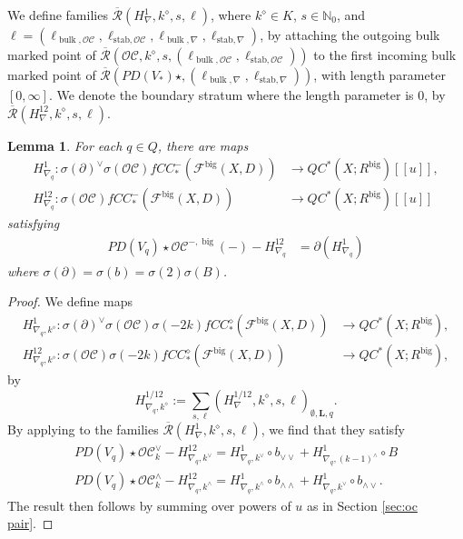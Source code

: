 \documentclass{article}
\newtheorem{lem}{Lemma}[section]
\def\fuk{\EuF}
\def\cO{\mathcal{O}}
\def\cC{\mathcal{C}}
\def\fuk{\mathcal{F}}
\def\Rbar{\overline{\mathcal{R}}}
\def\stab{\mathrm{stab}}
\def\big{{\operatorname{big}}}
\def\bL{\mathbf{L}}
\def\bulk{{\operatorname{bulk}}}
\begin{document}
We define families $\Rbar(H^{1}_\nabla,k^\diamond,s,\ell)$, where $k^\diamond \in K$, $s \in \mathbb{N}_0$, and $\ell=(\ell_{\bulk,\cO\cC},\ell_{\stab,\cO\cC},\ell_{\bulk,\nabla},\ell_{\stab,\nabla})$, by attaching the outgoing bulk marked point of $\Rbar(\cO\cC,k^\diamond,s,(\ell_{\bulk,\cO\cC},\ell_{\stab,\cO\cC}))$ to the first incoming bulk marked point of $\Rbar(PD(V_*)\star,(\ell_{\bulk,\nabla},\ell_{\stab,\nabla}))$, with length parameter $[0,\infty]$. 
We denote the boundary stratum where the length parameter is $0$, by $\Rbar(H^{12}_\nabla,k^\diamond,s,\ell)$.

\begin{lem}\label{lem:conn 1}
    For each $q \in Q$, there are maps
    \begin{align*}
        H^1_{\nabla_q}:\sigma(\partial)^\vee \sigma(\cO\cC) fCC_*^-(\fuk^\big(X,D)) & \to QC^*(X;R^\big)[[u]],\\
        H^{12}_{\nabla_q}:\sigma(\cO\cC)fCC_*^-(\fuk^\big(X,D)) &\to QC^*(X;R^\big)[[u]]
    \end{align*}
    satisfying
    \begin{align}\label{eq:H1 nab}
        PD(V_q) \star \cO\cC^{-,\big}(-) - H^{12}_{\nabla_q} &= \partial(H^1_{\nabla_q})
    \end{align}
    where $\sigma(\partial) = \sigma(b) = \sigma(2)\sigma(B)$.
\end{lem}
\begin{proof}
    We define maps
    \begin{align*}
        H^1_{\nabla_q,k^\diamond}:\sigma(\partial)^\vee\sigma(\cO\cC)\sigma(-2k) fCC_*^\diamond(\fuk^\big(X,D)) &\to QC^*(X;R^\big),\\
        H^{12}_{\nabla_q,k^\diamond}:\sigma(\cO\cC)\sigma(-2k) fCC_*^\diamond(\fuk^\big(X,D)) &\to QC^*(X;R^\big),
    \end{align*}
    by
    $$H^{1/12}_{\nabla_q,k^\diamond} := \sum_{s,\ell} (H^{1/12}_{\nabla},k^\diamond,s,\ell)_{\emptyset,\bL,q}.$$
    By applying \cite[Lemma 4.18]{relfukii} to the families $\Rbar(H^1_\nabla,k^\diamond,s,\ell)$, we find that they satisfy
    \begin{align*}
        PD(V_q) \star \cO\cC^\vee_k - H^{12}_{\nabla_q,k^\vee} = H^1_{\nabla_q,k^\vee} \circ b_{\vee\vee} + H^1_{\nabla_q,(k-1)^\wedge} \circ B\\
        PD(V_q) \star \cO\cC^\wedge_k - H^{12}_{\nabla_q,k^\wedge} = H^1_{\nabla_q,k^\wedge} \circ b_{\wedge\wedge} + H^1_{\nabla_q,k^\vee} \circ b_{\wedge\vee}.
    \end{align*}
    The result then follows by summing over powers of $u$ as in Section \ref{sec:oc pair}.
\end{proof}
\end{document}
